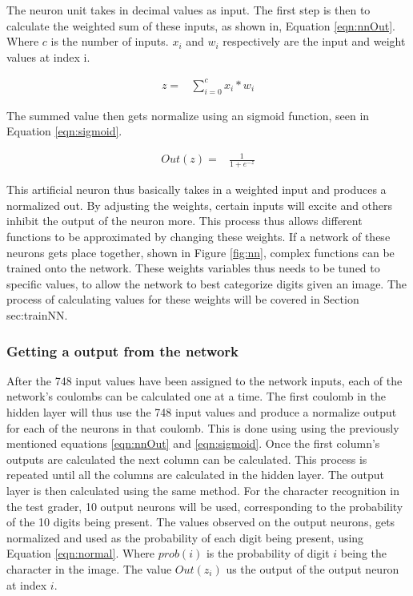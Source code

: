 The neuron unit takes in decimal values as input. The first step is then to calculate the weighted sum of these inputs, as shown in, Equation \ref{eqn:nnOut}.  Where $c$ is the number of inputs. $x_{i}$ and $w_{i}$ respectively are the input and weight values at index i. 

\begin{align}
  z =  &\displaystyle{\sum_{i=0}^{c} x_{i}*w_{i}}
\label{eqn:nnOut}
\end{align}

The summed value then gets normalize using an sigmoid function, seen in Equation \ref{eqn:sigmoid}.

\begin{align}
  Out(z) =  &\displaystyle{\frac{1}{1 + e^{-z}}}
\label{eqn:sigmoid}
\end{align}

This artificial neuron thus basically takes in a weighted input and produces a normalized out. By adjusting the weights, certain inputs will excite and others inhibit the output of the neuron more. This process thus allows different functions to be approximated by changing these weights. If a network of these neurons gets place together, shown in Figure \ref{fig:nn}, complex functions can be trained onto the network. These weights variables thus needs to be tuned to specific values, to allow the network to best categorize digits given an image. The process of calculating values for these weights will be covered in Section sec:trainNN.

\subsubsection{Getting a output from the network}

After the 748 input values have been assigned to the network inputs, each of the network's coulombs can be calculated one at a time. The first coulomb in the hidden layer will thus use the 748 input values and produce a normalize output for each of the neurons in that coulomb. This is done using using the previously mentioned equations \ref{eqn:nnOut} and \ref{eqn:sigmoid}. Once the first column's outputs are calculated the next column can be calculated. This process is repeated until all the columns are calculated in the hidden layer. The output layer is then calculated using the same method. For the character recognition in the test grader, 10 output neurons will be used, corresponding to the probability of the 10 digits being present. The values observed on the output neurons, gets normalized and used as the probability of each digit being present, using Equation  \ref{eqn:normal}. Where $prob(i)$ is the probability of digit $i$ being the character in the image. The value $Out(z_{i})$ us the output of the output neuron at index $i$.

